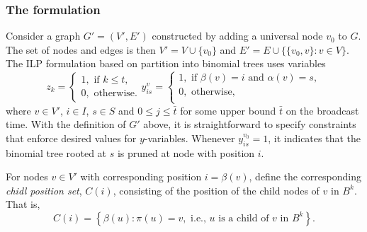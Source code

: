 \subsubsection{The formulation}
Consider a graph $G'=(V',E')$ constructed  by adding a universal node $v_0$ to $G$.
The set of nodes and edges is then $V'=V\cup \{v_0\}$ and $E'=E\cup\{\{v_0,v\}:v\in V\}$.
The ILP formulation based on partition into binomial trees uses variables
$$
z_{k}=
\begin{cases}
1, \text{ if } k\leq t,\\
0, \text{ otherwise}.
\end{cases}
y_{is}^v=
\begin{cases}
1, \text{ if } \beta(v)=i \text{ and } \alpha(v)=s,\\
0, \text{ otherwise},\\
\end{cases}
$$
where $v\in V'$, $i\in I$, $s\in S$ and $0\leq j\leq \bar{t}$ for some upper bound $\bar{t}$ on the broadcast time.
With the definition of $G'$ above, it is straightforward to specify constraints that enforce desired values for $y$-variables.
Whenever $y_{is}^{v_0}=1$, it indicates that the binomial tree rooted at $s$ is pruned at node with position $i$.
\begin{definition}
For nodes $v\in V'$ with corresponding position $i=\beta(v)$, define the corresponding \emph{chidl position set}, $C(i)$, 
consisting of the position of the child nodes of $v$ in $B^k$.
That is,
$$
	C(i)=\left\{\beta(u): \pi(u)=v,\text{ i.e., } u \text{ is a child of } v \text{ in } B^k\right\}.
$$
\end{definition}
